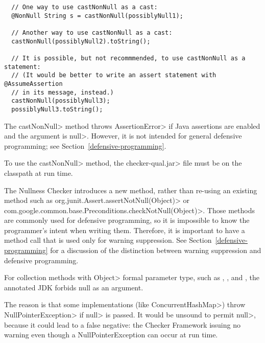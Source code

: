 \begin{Verbatim}
  // One way to use castNonNull as a cast:
  @NonNull String s = castNonNull(possiblyNull1);

  // Another way to use castNonNull as a cast:
  castNonNull(possiblyNull2).toString();

  // It is possible, but not recommmended, to use castNonNull as a statement:
  // (It would be better to write an assert statement with @AssumeAssertion
  // in its message, instead.)
  castNonNull(possiblyNull3);
  possiblyNull3.toString();
\end{Verbatim}

  The \<castNonNull> method throws \<AssertionError> if Java assertions are enabled and
  the argument is \<null>.  However, it is not intended for general defensive
  programming; see Section~\ref{defensive-programming}.

  To use the \<castNonNull> method, the \<checker-qual.jar> file
  must be on the classpath at run time.

\begin{sloppypar}
The Nullness Checker introduces a new method, rather than re-using an
existing method such as \<org.junit.Assert.assertNotNull(Object)> or
\<com.google.common.base.Preconditions.checkNotNull(Object)>.  Those
methods are commonly used for defensive programming, so it is impossible to
know the programmer's intent when writing them.  Therefore, it is important to
have a method call that is used only for warning suppression.  See
Section~\ref{defensive-programming} for a discussion of
the distinction between warning suppression and defensive programming.
\end{sloppypar}



For collection methods with \<Object> formal parameter type, such as
,
, and
,
the annotated JDK forbids null as an argument.

The reason is that some implementations (like \<ConcurrentHashMap>) throw
\<NullPointerException> if \<null> is passed.  It would be unsound to
permit \<null>, because it could lead to a false negative:  the Checker
Framework issuing no warning even though a NullPointerException can occur
at run time.

